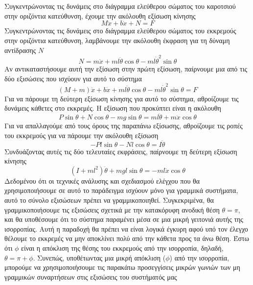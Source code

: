 Συγκεντρώνοντας τις δυνάμεις στο διάγραμμα ελεύθερου σώματος του καροτσιού στην οριζόντια κατεύθυνση, έχουμε την ακόλουθη εξίσωση κίνησης
\begin{equation}
M\ddot{x} + b\dot{x} + N = F
\end{equation}
Συγκεντρώνοντας τις δυνάμεις στο διάγραμμα ελεύθερου σώματος του εκκρεμούς στην οριζόντια κατεύθυνση, λαμβάνουμε την ακόλουθη έκφραση για τη δύναμη αντίδρασης $N$
\begin{equation}
N = m\ddot{x} + ml\ddot{\theta}\cos{\theta} - ml\dot{\theta}^2\sin{\theta}
\end{equation}
Αν αντικαταστήσουμε αυτή την εξίσωση στην πρώτη εξίσωση, παίρνουμε μια από τις δύο εξισώσεις που ισχύουν για αυτό το σύστημα
\begin{equation}
(M+m)\ddot{x} + b\dot{x} + ml\ddot{\theta}\cos{\theta}-ml\dot{\theta}^2\sin{\theta} = F
\end{equation}
Για να πάρουμε τη δεύτερη εξίσωση κίνησης για αυτό το σύστημα, αθροίζουμε τις δυνάμεις κάθετες στο εκκρεμές. Η εξίσωση που προκύπτει είναι η ακόλουθη
\begin{equation}
P\sin{\theta}+N\cos{\theta}-mg\sin{\theta}=ml\ddot{\theta}+m\ddot{x}\cos{\theta}
\end{equation}
Για να απαλλαγούμε από τους όρους της παραπάνω εξίσωσης, αθροίζουμε τις ροπές του εκκρεμούς για να πάρουμε την ακόλουθη εξίσωση
\begin{equation}
-Pl\sin{\theta}-Nl\cos{\theta}=I\ddot{\theta}
\end{equation}
Συνδυάζοντας αυτές τις δύο τελευταίες εκφράσεις, παίρνουμε τη δεύτερη εξίσωση κίνησης
\begin{equation}
\left(I+ml^2\right)\ddot{\theta}+mgl\sin{\theta}=-ml\ddot{x}\cos{\theta}
\end{equation}
Δεδομένου ότι οι τεχνικές ανάλυσης και σχεδιασμού ελέγχου που θα χρησιμοποιήσουμε σε αυτό το παράδειγμα ισχύουν μόνο για γραμμικά συστήματα, αυτό το σύνολο εξισώσεων πρέπει να γραμμικοποιηθεί. Συγκεκριμένα, θα γραμμικοποιήσουμε τις εξισώσεις σχετικά με την κατακόρυφη ανοδική θέση $\theta=\pi$, και θα υποθέσουμε ότι το σύστημα παραμένει μέσα σε μια μικρή γειτονιά αυτής της ισορροπίας. Αυτή η παραδοχή θα πρέπει να είναι λογικά έγκυρη αφού υπό τον έλεγχο θέλουμε το εκκρεμές να μην αποκλίνει πολύ από την κάθετα προς τα άνω θέση. Έστω ότι $\phi$ είναι η απόκλιση της θέσης του εκκρεμούς από την ισορροπία, δηλαδή, $\theta=\pi+\phi$. Συνεπώς, υποθέτωντας μια μικρή απόκλιση ($\phi$) από την ισορροπία, μπορούμε να χρησιμοποιήσουμε τις παρακάτω προσεγγίσεις μικρών γωνιών των μη γραμμικών συναρτήσεων στις εξισώσεις του συστήματός μας
